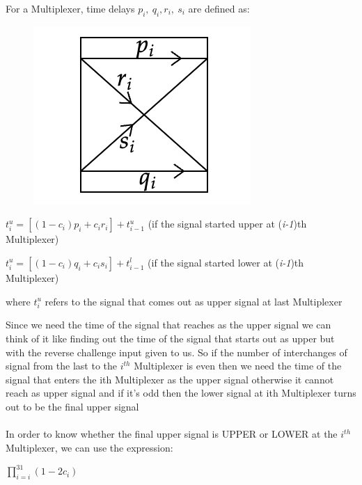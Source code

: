 \documentclass{article}
\begin{document}
For a Multiplexer, time delays $\displaystyle p_{i} ,\ q_{i} ,r_{i} ,\ s_{i}$ are defined as:
\begin{figure}[h]
  \centering
  \includegraphics[scale=0.75]{delays.png}
\end{figure}
\begin{center}
  \Large $t_{i}^{u} = [ (1-c_{i})p_i + c_ir_i] + t_{i-1}^{u}$ \large(if the signal started upper at (\textit{i-1})th Multiplexer)\\
\end{center}
\begin{center}
  \Large $t_{i}^{u} = [ (1-c_{i})q_i + c_is_i] + t_{i-1}^{l}$ \large(if the signal started lower at (\textit{i-1})th Multiplexer)\\
\end{center}
\begin{center}
{where $t_{i}^{u}$ refers to the signal that comes out as upper signal at last Multiplexer}
\end{center}
Since we need the time of the signal that reaches as the upper signal we can think of it like finding out the time of the signal that starts out as upper but with the reverse challenge input given to us. So if the number of interchanges of signal from the last to the $ i^{th}$ Multiplexer is even then we need the time of the signal that enters the ith Multiplexer as the upper signal otherwise it cannot reach as upper signal and if it's odd then the lower signal at ith Multiplexer turns out to be the final upper signal\\
\\In order to know whether the final upper signal is UPPER or LOWER at the $ i^{th}$ Multiplexer, we can use the expression:
\begin{center}
  \Large$\prod_{i=i}^{31} (1-2c_i)$
\end{center}
\end{document}
